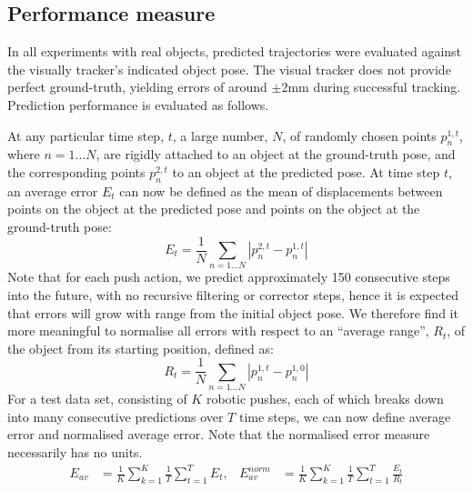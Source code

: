 
\subsection{Performance measure}\label{sec:Experiment.Performance}

In all experiments with real objects, predicted trajectories were evaluated against the visually tracker's indicated object pose. The visual tracker does not provide perfect ground-truth, yielding
errors of around $\pm$2mm during successful tracking. Prediction performance is evaluated as follows.

At any particular time step, $t$, a large number, $N$, of randomly chosen points $p_{n}^{1,t}$, where $n=1 \ldots N$, are rigidly attached to an object at the ground-truth pose, and the corresponding points $p_{n}^{2,t}$ to an object at the predicted pose. At time step $t$, an average error $E_t$ can now be defined as the mean of displacements between points on the object at the predicted pose and points on the object at the ground-truth pose:
\begin{equation}
E_t = \frac{1}{N} \mathop{\sum}_{n=1 \ldots N}|p_{n}^{2,t}-p_{n}^{1,t}|
\label{eq:defn_Rt}
\end{equation}
Note that for each push action, we predict approximately 150
consecutive steps into the future, with no recursive filtering or
corrector steps, hence it is expected that errors will grow with range
from the initial object pose. We therefore find it more meaningful to
normalise all errors with respect to an ``average range'', $R_t$, of
the object from its starting position, defined as:
\begin{equation}
R_t = \frac{1}{N} \mathop{\sum}_{n=1 \ldots N}|p_{n}^{1,t}-p_{n}^{1,0}|
\label{eq:defn_Et}
\end{equation}
For a test data set, consisting of $K$ robotic pushes, each of which breaks down into many consecutive predictions over $T$ time steps, we can now define average error and normalised average error. Note that the normalised error measure necessarily has no units.
\begin{align}
E_{av} &= \frac{1}{K} \mathop{\sum}_{k=1}^{K} \frac{1}{T} \mathop{\sum}_{t=1}^{T} E_t,
&E_{av}^{norm} &= \frac{1}{K} \mathop{\sum}_{k=1}^{K} \frac{1}{T} \mathop{\sum}_{t=1}^{T} \frac{E_t}{R_t}
\label{eq:Error1}
\end{align}


